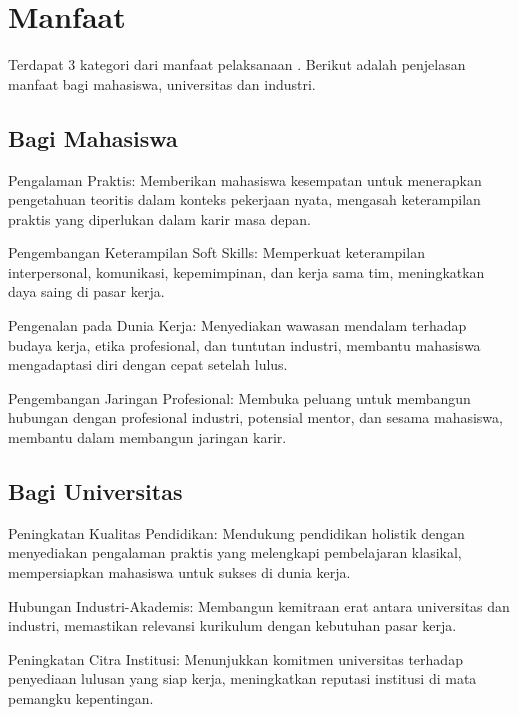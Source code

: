 \section{Manfaat \tipe}
Terdapat 3 kategori dari manfaat pelaksanaan \tipe. Berikut adalah penjelasan manfaat bagi mahasiswa, universitas dan industri.

\subsection{Bagi Mahasiswa}

\begin{packed_enum}
	\item Pengalaman Praktis: Memberikan mahasiswa kesempatan untuk menerapkan pengetahuan teoritis dalam konteks pekerjaan nyata, mengasah keterampilan praktis yang diperlukan dalam karir masa depan.
	\item Pengembangan Keterampilan Soft Skills: Memperkuat keterampilan interpersonal, komunikasi, kepemimpinan, dan kerja sama tim, meningkatkan daya saing di pasar kerja.
	\item Pengenalan pada Dunia Kerja: Menyediakan wawasan mendalam terhadap budaya kerja, etika profesional, dan tuntutan industri, membantu mahasiswa mengadaptasi diri dengan cepat setelah lulus.
	\item Pengembangan Jaringan Profesional: Membuka peluang untuk membangun hubungan dengan profesional industri, potensial mentor, dan sesama mahasiswa, membantu dalam membangun jaringan karir.
\end{packed_enum}

\subsection{Bagi Universitas}

\begin{packed_enum}
	\item Peningkatan Kualitas Pendidikan: Mendukung pendidikan holistik dengan menyediakan pengalaman praktis yang melengkapi pembelajaran klasikal, mempersiapkan mahasiswa untuk sukses di dunia kerja.
	\item Hubungan Industri-Akademis: Membangun kemitraan erat antara universitas dan industri, memastikan relevansi kurikulum dengan kebutuhan pasar kerja.
	\item Peningkatan Citra Institusi: Menunjukkan komitmen universitas terhadap penyediaan lulusan yang siap kerja, meningkatkan reputasi institusi di mata pemangku kepentingan.
\end{packed_enum}

